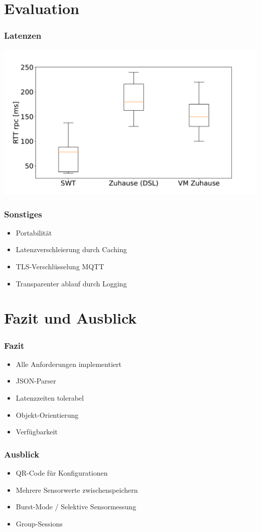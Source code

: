 \documentclass{beamer}
\begin{document}
\section{Evaluation}
\begin{frame}
    \frametitle[]{Latenzen}
    \includegraphics[width=\textwidth]{images/latencies.pdf}
\end{frame}
\begin{frame}
    \frametitle[]{Sonstiges}
    \begin{itemize}
        \item Portabilität
        \item Latenzverschleierung durch Caching
        \item TLS-Verschlüsselung MQTT
        \item Transparenter ablauf durch Logging
    \end{itemize}
\end{frame}
\section{Fazit und Ausblick}
\begin{frame}
    \frametitle[]{Fazit}
    \begin{itemize}
        \item Alle Anforderungen implementiert
        \item JSON-Parser
        \item Latenzzeiten tolerabel
        \item Objekt-Orientierung
        \item Verfügbarkeit
    \end{itemize}
\end{frame}
\begin{frame}
    \frametitle[]{Ausblick}
    \begin{itemize}
        \item QR-Code für Konfigurationen
        \item Mehrere Sensorwerte zwischenspeichern
        \item Burst-Mode / Selektive Sensormessung
        \item Group-Sessions
    \end{itemize}
\end{frame}
\end{document}
